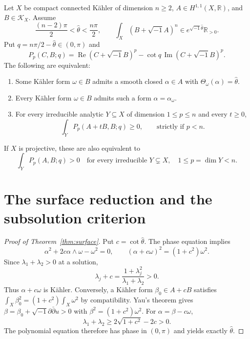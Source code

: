 \documentclass[12pt,reqno]{amsart}
\newcommand{\ii}{\sqrt{-1}}
\newcommand{\ddc}{\ii\partial\bar\partial}
\newcommand{\R}{\mathbb R}
\newcommand{\Rea}{\operatorname{Re}}
\newcommand{\Ima}{\operatorname{Im}}
\begin{document}
\begin{theorem}\label{thm:numerical}
Let $X$ be compact connected K\"ahler of dimension $n\ge2$,
$A\in H^{1,1}(X,\R)$, and $B\in\mathcal K_X$. Assume
\[
 \frac{(n-2)\pi}{2}<\widehat\theta<\frac{n\pi}{2},\qquad
 \int_X(B+\ii A)^n\in e^{\ii\widehat\theta}\R_{>0}.
\]
Put $q=n\pi/2-\widehat\theta\in(0,\pi)$ and
\[
 P_p(C,B;q)=\Rea(C+\ii B)^p-\cot q\,\Ima(C+\ii B)^p.
\]
The following are equivalent:
\begin{enumerate}
\item Some K\"ahler form $\omega\in B$ admits a smooth closed $\alpha\in A$ with $\Theta_\omega(\alpha)=\widehat\theta$.
\item Every K\"ahler form $\omega\in B$ admits such a form $\alpha=\alpha_\omega$.
\item For every irreducible analytic $Y\subseteq X$ of dimension $1\le p\le n$ and every $t\ge0$,
\[
 \int_Y P_p(A+tB,B;q)\ge0,
 \qquad\text{strictly if }p<n.
\]
\end{enumerate}
If $X$ is projective, these are also equivalent to
\[
 \int_Y P_p(A,B;q)>0
 \quad\text{for every irreducible }Y\subsetneq X,
 \quad 1\le p=\dim Y<n.
\]
\end{theorem}

\section{The surface reduction and the subsolution criterion}\label{sec:analytic}
\begin{proof}[Proof of Theorem~\ref{thm:surface}]\label{proof:surface}
Put $c=\cot\widehat\theta$. The phase equation implies
\[
 \alpha^2+2c\alpha\wedge\omega-\omega^2=0,
 \qquad (\alpha+c\omega)^2=(1+c^2)\omega^2.
\]
Since $\lambda_1+\lambda_2>0$ at a solution,
\[
 \lambda_j+c=\frac{1+\lambda_j^2}{\lambda_1+\lambda_2}>0.
\]
Thus $\alpha+c\omega$ is K\"ahler. Conversely, a K\"ahler form
$\beta_0\in A+cB$ satisfies
$\int_X\beta_0^2=(1+c^2)\int_X\omega^2$ by compatibility.
Yau's theorem \cite{Yau} gives $\beta=\beta_0+\ddc u>0$ with
$\beta^2=(1+c^2)\omega^2$. For $\alpha=\beta-c\omega$,
\[
 \lambda_1+\lambda_2\ge2\sqrt{1+c^2}-2c>0.
\]
The polynomial equation therefore has phase in $(0,\pi)$ and yields exactly $\widehat\theta$.
\end{proof}
\end{document}
